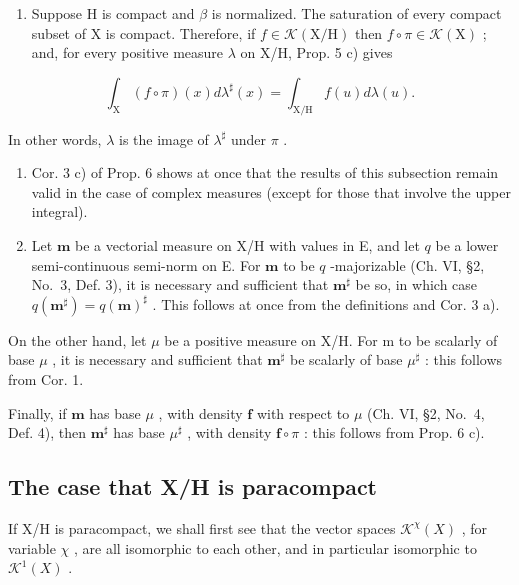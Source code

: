 \begin{enumerate}
\def\labelenumi{\arabic{enumi})}
\setcounter{enumi}{1}
\tightlist
\item
  Suppose H is compact and \(\beta\) is normalized. The saturation of every compact subset of X is compact. Therefore, if \(f \in \mathcal{K}(\mathrm{X}/\mathrm{H})\) then \(f \circ \pi \in \mathcal{K}(\mathrm{X})\) ; and, for every positive measure \(\lambda\) on X/H, Prop. 5 c) gives
\end{enumerate}

\[
\int_ {\mathrm{X}} (f \circ \pi) (x) d \lambda^ {\sharp} (x) = \int_ {\mathrm{X/H}} f (u) d \lambda (u).
\]

In other words, \(\lambda\) is the image of \(\lambda^{\sharp}\) under \(\pi\) .

\begin{enumerate}
\def\labelenumi{\arabic{enumi})}
\setcounter{enumi}{2}
\item
  Cor. 3 c) of Prop. 6 shows at once that the results of this subsection remain valid in the case of complex measures (except for those that involve the upper integral).
\item
  Let \(\mathbf{m}\) be a vectorial measure on X/H with values in E, and let \(q\) be a lower semi-continuous semi-norm on E. For \(\mathbf{m}\) to be \(q\) -majorizable (Ch. VI, §2, No.~3, Def. 3), it is necessary and sufficient that \(\mathbf{m}^{\sharp}\) be so, in which case \(q(\mathbf{m}^{\sharp}) = q(\mathbf{m})^{\sharp}\) . This follows at once from the definitions and Cor. 3 a).
\end{enumerate}

On the other hand, let \(\mu\) be a positive measure on X/H. For m to be scalarly of base \(\mu\) , it is necessary and sufficient that \(\mathbf{m}^{\sharp}\) be scalarly of base \(\mu^{\sharp}\) : this follows from Cor. 1.

Finally, if \(\mathbf{m}\) has base \(\mu\) , with density \(\mathbf{f}\) with respect to \(\mu\) (Ch. VI, §2, No.~4, Def. 4), then \(\mathbf{m}^{\sharp}\) has base \(\mu^{\sharp}\) , with density \(\mathbf{f} \circ \pi\) : this follows from Prop. 6 c).

\subsection{The case that X/H is paracompact}

If X/H is paracompact, we shall first see that the vector spaces \(\mathcal{K}^{\chi}(X)\) , for variable \(\chi\) , are all isomorphic to each other, and in particular isomorphic to \(\mathcal{K}^{1}(X)\) .

